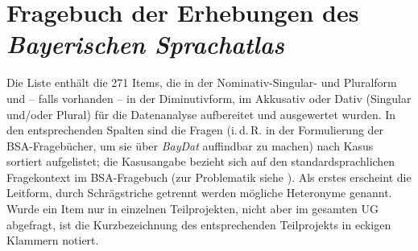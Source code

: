 \chapter{Fragebuch der Erhebungen des \textit{Bayerischen Sprachatlas}}
Die Liste enthält die 271 Items, die in der Nominativ-Singular- und Pluralform und -- falls vorhanden -- in der Diminutivform, im Akkusativ oder Dativ (Singular und/oder Plural) für die Datenanalyse aufbereitet und ausgewertet wurden. In den entsprechenden Spalten sind die Fragen (i.\,d.\,R. in der Formulierung der BSA-Fragebücher, um sie über \textit{BayDat} auffindbar zu machen) nach Kasus sortiert aufgelistet; die Kasusangabe bezieht sich auf den standardsprachlichen Fragekontext im BSA-Fragebuch (zur Problematik siehe ). Als erstes erscheint die Leitform, durch Schrägstriche getrennt werden mögliche Heteronyme genannt. Wurde ein Item nur in einzelnen Teilprojekten, nicht aber im gesamten UG abgefragt, ist die Kurzbezeichnung des entsprechenden Teilprojekts in eckigen Klammern notiert.

